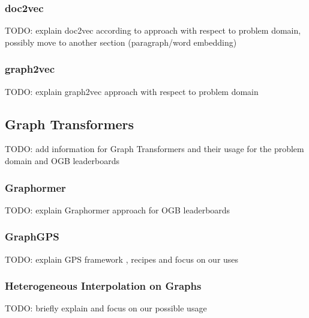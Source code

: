 \subsubsection{doc2vec}
TODO: explain doc2vec according to \cite{2014doc2vec} approach with respect to problem domain, possibly move to another section (paragraph/word embedding)

\subsubsection{graph2vec}
TODO: explain graph2vec \cite{2017graph2vec} approach with respect to problem domain

\subsection{Graph Transformers}
TODO: add information for Graph Transformers \cite{2020graphTransformers} \cite{li2019graphTransformer} \cite{cai2019graphTransformerSequence} \cite{dwivedi2021generalizationTransformer} and their usage for the problem domain and OGB leaderboards

\subsubsection{Graphormer}
TODO: explain Graphormer \cite{2021graphormer} approach for OGB leaderboards

\subsubsection{GraphGPS}
TODO: explain GPS framework \cite{2023graphgps}, recipes and focus on our uses

\subsubsection{Heterogeneous Interpolation on Graphs}
TODO: briefly explain and focus on our possible usage
